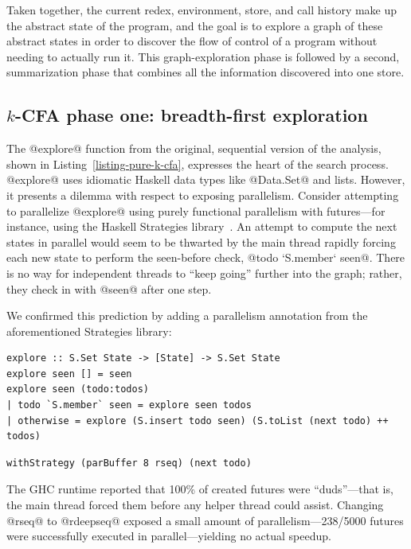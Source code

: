 Taken together, the current redex, environment, store, and call
history make up the abstract state of the program, and the goal is to
explore a graph of these abstract states in order to discover the flow
of control of a program without needing to actually run it.  This
graph-exploration phase is followed by a second, summarization phase
that combines all the information discovered into one store.

\subsection{$k$-CFA phase one: breadth-first exploration}

The @explore@ function from the original, sequential version of the
analysis, shown in Listing~\ref{listing-pure-k-cfa}, expresses the
heart of the search process.  @explore@ uses idiomatic Haskell data
types like @Data.Set@ and lists.  However, it presents a dilemma with
respect to exposing parallelism.  Consider attempting to parallelize
@explore@ using purely functional parallelism with futures---for
instance, using the Haskell Strategies library~\cite{marlow-par}.  An
attempt to compute the next states in parallel would seem to be
thwarted by the main thread rapidly forcing each new state to perform
the seen-before check, @todo `S.member` seen@.  There is no way for
independent threads to ``keep going'' further into the graph; rather,
they check in with @seen@ after one step.

We confirmed this prediction by adding a parallelism annotation from
the aforementioned Strategies library:



\singlespacing
\begin{lstlisting}[float, caption={The \il{explore} function from a purely functional $k$-CFA implementation.}, label=listing-pure-k-cfa]
explore :: S.Set State -> [State] -> S.Set State
explore seen [] = seen
explore seen (todo:todos)
| todo `S.member` seen = explore seen todos
| otherwise = explore (S.insert todo seen) (S.toList (next todo) ++ todos)
\end{lstlisting}
\doublespacing

\singlespacing
\begin{lstlisting}
withStrategy (parBuffer 8 rseq) (next todo)
\end{lstlisting}
\doublespacing

\noindent The GHC runtime reported that 100\% of created futures were
``duds''---that is, the main thread forced them before any helper
thread could assist.  Changing @rseq@ to @rdeepseq@ exposed a small
amount of parallelism---238/5000 futures were successfully executed in
parallel---yielding no actual speedup.

